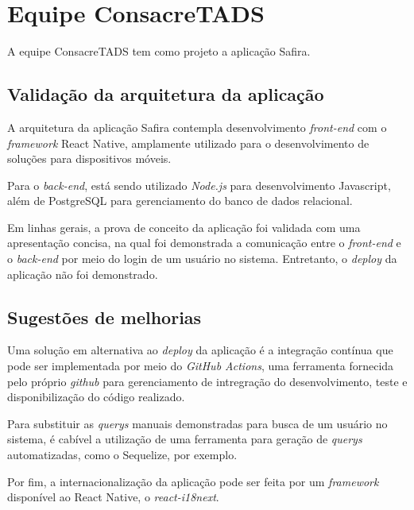 \chapter{Equipe ConsacreTADS}

A equipe ConsacreTADS tem como projeto a aplicação Safira.

\section{Validação da arquitetura da aplicação}
A arquitetura da aplicação Safira contempla desenvolvimento \textit{\gls{front-end}} com o \textit{\gls{framework}} React Native, amplamente utilizado para o desenvolvimento de soluções para dispositivos móveis.


Para o \textit{\gls{back-end}}, está sendo utilizado \textit{Node.js} para desenvolvimento Javascript, além de PostgreSQL para gerenciamento do banco de dados relacional.


Em linhas gerais, a prova de conceito da aplicação foi validada com uma apresentação concisa, na qual foi demonstrada a comunicação entre o \textit{\gls{front-end}} e o \textit{\gls{back-end}} por meio do login de um usuário no sistema. Entretanto, o \textit{\gls{deploy}} da aplicação não foi demonstrado.

\section{Sugestões de melhorias}
Uma solução em alternativa ao \textit{\gls{deploy}} da aplicação é a integração contínua que pode ser implementada por meio do \textit{GitHub Actions}, uma ferramenta fornecida pelo próprio \textit{\gls{github}} para gerenciamento de intregração do desenvolvimento, teste e disponibilização do código realizado.


Para substituir as \textit{\glspl{query}} manuais demonstradas para busca de um usuário no sistema, é cabível a utilização de uma ferramenta para geração de \textit{\glspl{query}} automatizadas, como o Sequelize, por exemplo.


Por fim, a internacionalização da aplicação pode ser feita por um \textit{\gls{framework}} disponível ao React Native, o \textit{\gls{react-i18next}}.